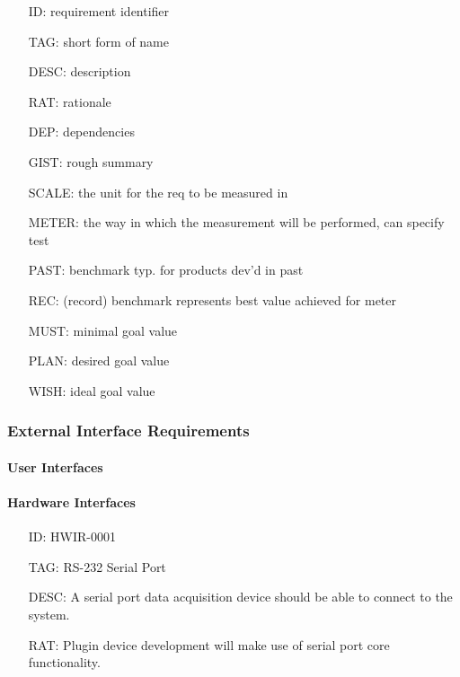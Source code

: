     \begin{itemize}
      \setlength{\itemindent}{.5in}
      \itemsep .15em
      \item[ID:] requirement identifier
      \item[TAG:] short form of name
      \item[DESC:] description
      \item[RAT:] rationale
      \item[DEP:] dependencies
      \item[GIST:] rough summary
      \item[SCALE:] the unit for the req to be measured in
      \item[METER:] the way in which the measurement will be performed, can specify test
      \item[PAST:] benchmark typ. for products dev'd in past
      \item[REC:] (record) benchmark represents best value achieved for meter
      \item[MUST:] minimal goal value
      \item[PLAN:] desired goal value
      \item[WISH:] ideal goal value
    \end{itemize}

    \subsubsection{External Interface Requirements}\label{sec:req-srs-func}

      \paragraph{User Interfaces}

      \paragraph{Hardware Interfaces}

        \begin{itemize}
          \setlength{\itemindent}{.5in}
          \itemsep .15em
          \item[ID:] HWIR-0001
          \item[TAG:] RS-232 Serial Port
          \item[DESC:] A serial port data acquisition device should be able
            to connect to the system.
          \item[RAT:] Plugin device development will make use of serial port
            core functionality.
        \end{itemize}

